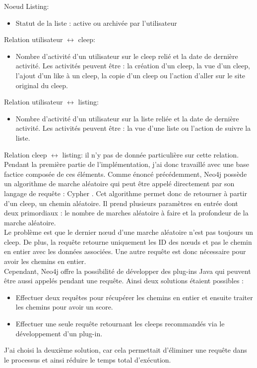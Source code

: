 \documentclass{article} %
\begin{document}
Noeud Listing:
\begin{itemize}
 \item Statut de la liste : active ou archivée par l'utilisateur
 
\end{itemize}
Relation utilisateur $\leftrightarrow$ cleep:
\begin{itemize}
 \item Nombre d'activité d'un utilisateur sur le cleep relié et la date de dernière activité. Les activités peuvent être : la création d'un cleep, la vue d'un cleep, l'ajout d'un like à un cleep, la copie d'un cleep ou l'action d'aller sur le site original du cleep.
\end{itemize}

Relation utilisateur $\leftrightarrow$ listing:
\begin{itemize}
 \item Nombre d'activité d'un utilisateur sur la liste reliée et la date de dernière activité. Les activités peuvent être : la vue d'une liste ou l'action de suivre la liste. 
\end{itemize}

Relation cleep $\leftrightarrow$ listing: il n'y pas de donnée particulière sur cette relation.\\

Pendant la première partie de l'implémentation, j'ai donc travaillé avec une base factice composée de ces éléments. Comme énoncé précédemment, Neo4j possède un algorithme de marche aléatoire qui peut être appelé directement par son langage de requête : Cypher \cite{cypher}. Cet algorithme permet donc de retourner à partir d'un cleep, un chemin aléatoire. Il prend plusieurs paramètres en entrée dont deux primordiaux : le nombre de marches aléatoire à faire et la profondeur de la marche aléatoire.\\
Le problème est que le dernier nœud d'une marche aléatoire n'est pas toujours un cleep. De plus, la requête retourne uniquement les ID des nœuds et pas le chemin en entier avec les données associées. Une autre requête est donc nécessaire pour avoir les chemins en entier.\\
Cependant, Neo4j offre la possibilité de développer des plug-ins Java qui peuvent être aussi appelés pendant une requête. Ainsi deux solutions étaient possibles :
\begin{itemize}
 \item Effectuer deux requêtes pour récupérer les chemins en entier et ensuite traiter les chemins pour avoir un score.
 \item Effectuer une seule requête retournant les cleeps recommandés via le développement d'un plug-in.
\end{itemize}
J'ai choisi la deuxième solution, car cela permettait d'éliminer une requête dans le processus et ainsi réduire le temps total d'exécution. 
\newpage
\end{document}
